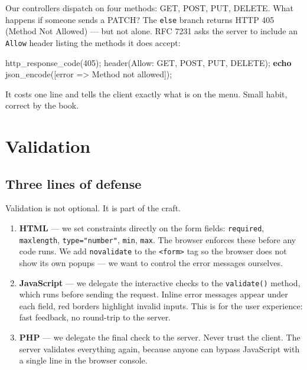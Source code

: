 \documentclass[11pt,a4paper,oneside]{book}
\newenvironment{Shaded}{\begin{snugshade}}{\end{snugshade}}
\newcommand{\KeywordTok}[1]{\textcolor[HTML]{007020}{\textbf{#1}}}
\newcommand{\DecValTok}[1]{\textcolor[HTML]{40A070}{#1}}
\newcommand{\StringTok}[1]{\textcolor[HTML]{4070A0}{#1}}
\newcommand{\OtherTok}[1]{\textcolor[HTML]{007020}{#1}}
\newcommand{\FunctionTok}[1]{\textcolor[HTML]{06287E}{#1}}
\newcommand{\NormalTok}[1]{#1}
\begin{document}
Our controllers dispatch on four methods: GET, POST, PUT, DELETE.
What happens if someone sends a PATCH? The \texttt{else} branch
returns HTTP 405 (Method Not Allowed) --- but not alone. RFC 7231
asks the server to include an \texttt{Allow} header listing the
methods it does accept:

\begin{Shaded}
\begin{Highlighting}[]
\FunctionTok{http\_response\_code}\NormalTok{(}\DecValTok{405}\NormalTok{)}\OtherTok{;}
\FunctionTok{header}\NormalTok{(}\StringTok{\textquotesingle{}Allow: GET, POST, PUT, DELETE\textquotesingle{}}\NormalTok{)}\OtherTok{;}
\KeywordTok{echo} \FunctionTok{json\_encode}\NormalTok{([}\StringTok{\textquotesingle{}error\textquotesingle{}}\NormalTok{ =\textgreater{} }\StringTok{\textquotesingle{}Method not allowed\textquotesingle{}}\NormalTok{])}\OtherTok{;}
\end{Highlighting}
\end{Shaded}

It costs one line and tells the client exactly what is on the
menu. Small habit, correct by the book.

\newpage

\hypertarget{validation}{%
\chapter{Validation}\label{validation}}

\hypertarget{three-lines-of-defense}{%
\section{Three lines of defense}\label{three-lines-of-defense}}

Validation is not optional. It is part of the craft.

\begin{enumerate}
\def\labelenumi{\arabic{enumi}.}
\item
  \textbf{HTML} --- we set constraints directly on the form
  fields: \texttt{required}, \texttt{maxlength},
  \texttt{type="number"}, \texttt{min}, \texttt{max}. The browser
  enforces these before any code runs. We add \texttt{novalidate}
  to the \texttt{\textless{}form\textgreater{}} tag so the
  browser does not show its own popups --- we want to control the
  error messages ourselves.
\item
  \textbf{JavaScript} --- we delegate the interactive checks to
  the \texttt{validate()} method, which runs before sending the
  request. Inline error messages appear under each field, red
  borders highlight invalid inputs. This is for the user
  experience: fast feedback, no round-trip to the server.
\item
  \textbf{PHP} --- we delegate the final check to the server.
  Never trust the client. The server validates everything again,
  because anyone can bypass JavaScript with a single line in the
  browser console.
\end{enumerate}
\end{document}
